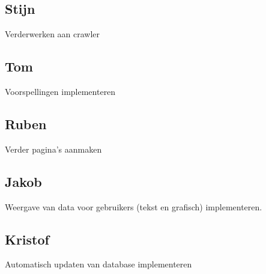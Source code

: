 \documentclass[11pt, a4paper]{article}
\begin{document}
\subsection{Stijn}
Verderwerken aan crawler
\subsection{Tom}
Voorspellingen implementeren
\subsection{Ruben}
Verder pagina's aanmaken
\subsection{Jakob}
Weergave van data voor gebruikers (tekst en grafisch) implementeren.
\subsection{Kristof}
Automatisch updaten van database implementeren
\end{document}
